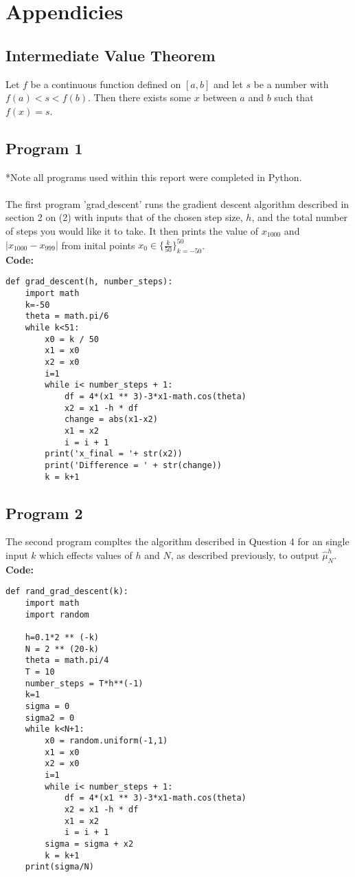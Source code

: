 \documentclass{article}
\begin{document}
\newpage

\section{Appendicies}

\subsection{Intermediate Value Theorem}
\label{IVT}
Let $f$ be a continuous function defined on $[a, b]$ and let $s$ be a number with $f(a) < s < f(b)$. Then there exists some $x$ between $a$ and $b$ such that $f(x) = s$.

\subsection{Program 1}
\label{subsec:Program 1}
*Note all programs used within this report were completed in Python.\\
\\
The first program 'grad$\_$descent' runs the gradient descent algorithm described in section 2 on (2) with inputs that of the chosen step size,  $h$, and the total number of steps you would like it to take. It then prints the value of $x_{1000}$ and $|x_{1000}-x_{999}|$ from inital points  $x_0 \in \{\frac{k}{50}\}^{50}_{k=-50}$.\\
\textbf{Code:}
\begin{lstlisting}
def grad_descent(h, number_steps):
    import math
    k=-50
    theta = math.pi/6
    while k<51:
        x0 = k / 50
        x1 = x0
        x2 = x0
        i=1
        while i< number_steps + 1:
            df = 4*(x1 ** 3)-3*x1-math.cos(theta)
            x2 = x1 -h * df
            change = abs(x1-x2)
            x1 = x2
            i = i + 1
        print('x_final = '+ str(x2))
        print('Difference = ' + str(change))
        k = k+1
\end{lstlisting}

\subsection{Program 2}
\label{subsec:Program 2}
The second program compltes the algorithm described in Question 4 for an single input $k$ which effects values of $h$ and $N$, as described previously, to output $\hat{\mu}_N^h$.\\
\textbf{Code:}
\begin{lstlisting}
def rand_grad_descent(k):
    import math
    import random

    h=0.1*2 ** (-k)
    N = 2 ** (20-k)
    theta = math.pi/4
    T = 10
    number_steps = T*h**(-1)
    k=1
    sigma = 0
    sigma2 = 0
    while k<N+1:
        x0 = random.uniform(-1,1)
        x1 = x0
        x2 = x0
        i=1
        while i< number_steps + 1:
            df = 4*(x1 ** 3)-3*x1-math.cos(theta)
            x2 = x1 -h * df
            x1 = x2
            i = i + 1
        sigma = sigma + x2
        k = k+1
    print(sigma/N)
\end{lstlisting}
\end{document}
